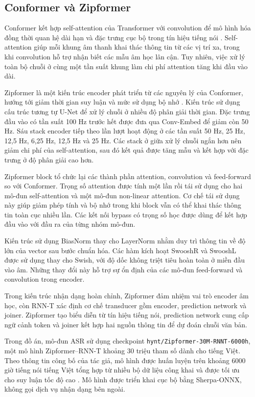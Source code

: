 \documentclass[a4paper,13pt,oneside]{report}
\begin{document}
\subsection{Conformer và Zipformer}

Conformer kết hợp self-attention của Transformer với convolution để mô hình hóa đồng thời quan hệ dài hạn và đặc trưng cục bộ trong tín hiệu tiếng nói \cite{conformer}. Self-attention giúp mỗi khung âm thanh khai thác thông tin từ các vị trí xa, trong khi convolution hỗ trợ nhận biết các mẫu âm học lân cận. Tuy nhiên, việc xử lý toàn bộ chuỗi ở cùng một tần suất khung làm chi phí attention tăng khi đầu vào dài.

Zipformer là một kiến trúc encoder phát triển từ các nguyên lý của Conformer, hướng tới giảm thời gian suy luận và mức sử dụng bộ nhớ \cite{zipformer}. Kiến trúc sử dụng cấu trúc tương tự U-Net để xử lý chuỗi ở nhiều độ phân giải thời gian. Đặc trưng đầu vào có tần suất 100 Hz trước hết được đưa qua Conv-Embed để giảm còn 50 Hz. Sáu stack encoder tiếp theo lần lượt hoạt động ở các tần suất 50 Hz, 25 Hz, 12,5 Hz, 6,25 Hz, 12,5 Hz và 25 Hz. Các stack ở giữa xử lý chuỗi ngắn hơn nên giảm chi phí của self-attention, sau đó kết quả được tăng mẫu và kết hợp với đặc trưng ở độ phân giải cao hơn.

Zipformer block tổ chức lại các thành phần attention, convolution và feed-forward so với Conformer. Trọng số attention được tính một lần rồi tái sử dụng cho hai mô-đun self-attention và một mô-đun non-linear attention. Cơ chế tái sử dụng này giúp giảm phép tính và bộ nhớ trong khi block vẫn có thể khai thác thông tin toàn cục nhiều lần. Các kết nối bypass có trọng số học được dùng để kết hợp đầu vào với đầu ra của từng nhóm mô-đun.

Kiến trúc sử dụng BiasNorm thay cho LayerNorm nhằm duy trì thông tin về độ lớn của vector sau bước chuẩn hóa. Các hàm kích hoạt SwooshR và SwooshL được sử dụng thay cho Swish, với độ dốc không triệt tiêu hoàn toàn ở miền đầu vào âm. Những thay đổi này hỗ trợ sự ổn định của các mô-đun feed-forward và convolution trong encoder.

Trong kiến trúc nhận dạng hoàn chỉnh, Zipformer đảm nhiệm vai trò encoder âm học, còn RNN-T xác định cơ chế transducer gồm encoder, prediction network và joiner. Zipformer tạo biểu diễn từ tín hiệu tiếng nói, prediction network cung cấp ngữ cảnh token và joiner kết hợp hai nguồn thông tin để dự đoán chuỗi văn bản.

Trong đồ án, mô-đun ASR sử dụng checkpoint \texttt{hynt/Zipformer-30M-RNNT-6000h}, một mô hình Zipformer--RNN-T khoảng 30 triệu tham số dành cho tiếng Việt. Theo thông tin công bố của tác giả, mô hình được huấn luyện trên khoảng 6000 giờ tiếng nói tiếng Việt tổng hợp từ nhiều bộ dữ liệu công khai và được tối ưu cho suy luận tốc độ cao \cite{zipformer6000h}. Mô hình được triển khai cục bộ bằng Sherpa-ONNX, không gọi dịch vụ nhận dạng bên ngoài.
\end{document}
